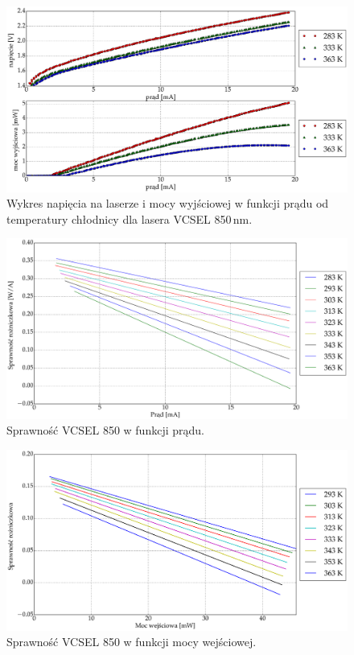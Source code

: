 \begin{figure}
\center
  \includegraphics[scale=0.30]{plot_vcsel_850/plot_power_voltage.eps}
  \caption{Wykres napięcia na laserze i mocy wyjściowej w funkcji prądu od temperatury chłodnicy dla lasera VCSEL 850\,nm.}
  \label{vcsel_850_rys_2}
\end{figure}
\begin{figure}
\center
  \includegraphics[scale=0.30]{plot_vcsel_850/plot_eff_all_via_current.eps}
  \caption{Sprawność VCSEL 850 w funkcji prądu.}
  \label{vcsel_850_rys_3}
\end{figure}
\begin{figure}
\center
  \includegraphics[scale=0.30]{plot_vcsel_850/plot_eff_all_via_power.eps}
  \caption{Sprawność VCSEL 850 w funkcji mocy wejściowej.}
  \label{vcsel_850_rys_4}
\end{figure}
